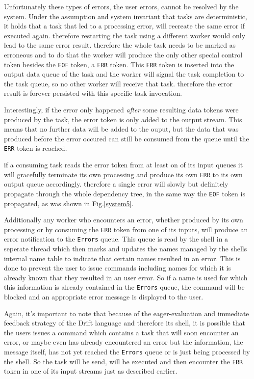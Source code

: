 Unfortunately these types of errors, the user errors, cannot be
resolved by the system. Under the assumption and system invariant
that tasks are deterministic, it holds that a task that led to
a processing error, will recreate the same error if executed again.
therefore restarting the task using a different worker would only
lead to the same error result. therefore the whole task needs to
be marked as erroneous and to do that the worker will produce
the only other special control token besides the \texttt{EOF} token,
a \texttt{ERR} token. This \texttt{ERR} token is inserted into the
output data queue of the task and the worker will signal the task
completion to the task queue, so no other worker will receive
that task. therefore the error result is forever persisted with
this specific task invocation.

Interestingly, if the error only happened \textit{after} some
resulting data tokens were produced by the task, the error token
is only added to the output stream. This means that no further data
will be added to the ouput, but the data that was produced before the
error occured can still be consumed from the queue until the
\texttt{ERR} token is reached.

if a consuming task reads the error token from at least on of
its input queues it will gracefully terminate its own processing
and produce its own \texttt{ERR} to its own output queue accordingly.
therefore a single error will slowly but definitely propagate through
the whole dependency tree, in the same way the \texttt{EOF} token
is propagated, as was shown in Fig.\ref{system5}.

Additionally any worker who encounters an error, whether produced
by its own processing or by consuming the \texttt{ERR} token from
one of its inputs, will produce an error notification to the
\texttt{Errors} queue. This queue is read by the shell in a
seperate thread which then marks and updates the names managed by the
shells internal name table to indicate that certain names
resulted in an error. This is done to prevent the user to issue
commands including names for which it is already known that they
resulted in an user error. So if a name is used for which this
information is already contained in the \texttt{Errors} queue,
the command will be blocked and an appropriate error message is
displayed to the user.

Again, it's important to note that because of the eager-evaluation
and immediate feedback strategy of the Drift language and therefore
its shell, it is possible that the users issues a command which contains
a task that will soon encounter an error, or maybe even has already
encountered an error but the information, the message itself, has
not yet reached the \texttt{Errors} queue or is just being processed
by the shell. So the task will be send, will be executed and then
encounter the \texttt{ERR} token in one of its input streams just
as described earlier.

